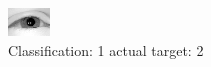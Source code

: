 \begin{figure}[h!]
\begin{center}
\includegraphics[width=0.60\columnwidth]{figures/ID2264_class_1_target_2.png}
\end{center}
\caption{ Classification: 1 actual target: 2}
\label{fig:ID2264_class_1_target_2}
\end{figure}
